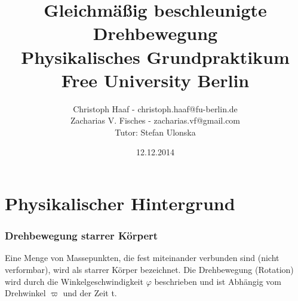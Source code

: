 \documentclass[%
   final,      %
   paper=a4, paper=portrait, pagesize=auto, %
   fontsize=11pt, %
   ngerman, %
 ]{scrartcl} %
\begin{document}
%

\subject{Protokoll}
\title{Gleichmäßig beschleunigte Drehbewegung \\ \normalsize Physikalisches Grundpraktikum \\ Free University Berlin}
\date{12.12.2014}
\author{Christoph Haaf - christoph.haaf@fu-berlin.de  \\ Zacharias V. Fisches - zacharias.vf@gmail.com \\ Tutor: Stefan Ulonska}


\maketitle




\tableofcontents
\newpage

%
%

%

\section{Physikalischer Hintergrund}
\subsubsection{Drehbewegung starrer Körpert}
Eine Menge von Massepunkten, die fest miteinander verbunden sind (nicht verformbar), wird als starrer Körper bezeichnet. Die Drehbewegung (Rotation) wird durch die Winkelgeschwindigkeit $\varphi$ beschrieben und ist Abhängig vom Drehwinkel $\varpi$ und der Zeit t.
\end{document}
